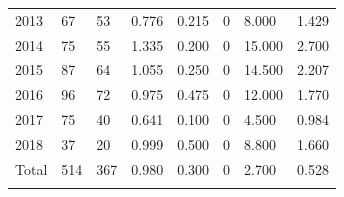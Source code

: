 \documentclass[12pt]{article}
\begin{document}
\begin{table} [ht]
\begin{tabular}{p{3.2cm} p{1.2cm} p{1.2cm} p{1.2cm} p{1.2cm} p{1.2cm} p{1.2cm} p{1.2cm}}
2013 & 67 & 53 & 0.776 & 0.215 & 0 & 8.000 & 1.429 \\
2014 & 75 & 55 & 1.335 & 0.200 & 0 & 15.000 & 2.700 \\
2015 & 87 & 64 & 1.055 & 0.250 & 0 & 14.500 & 2.207 \\
2016 & 96 & 72 & 0.975 & 0.475 & 0 & 12.000 & 1.770 \\
2017 & 75 & 40 & 0.641 & 0.100 & 0 & 4.500 & 0.984 \\
2018 & 37 & 20 & 0.999 & 0.500 & 0 & 8.800 & 1.660 \\
\cmidrule(l){2-8}
Total & 514 & 367 & 0.980 & 0.300 & 0 & 2.700 & 0.528 \\
 & & \\
\end{tabular}
\label{table3}
\end{table}
\end{document}
